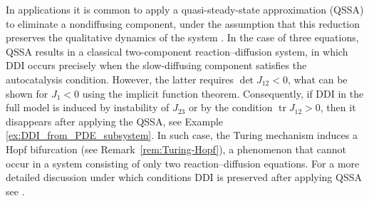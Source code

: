 \documentclass[12pt, a4paper]{amsart}
\numberwithin{equation}{section}
\DeclareMathOperator{\tr}{tr}
\begin{document}
In applications it is common to apply a quasi-steady-state
approximation (QSSA) to eliminate a nondiffusing component, under the
assumption that this reduction preserves the qualitative dynamics of
the system \cite{Haerting17,Zhang2024}. In the case of three equations, QSSA results in a
classical two-component reaction--diffusion system, in which DDI occurs precisely when the slow-diffusing component satisfies the autocatalysis condition.
However, the latter requires $\det J_{12} < 0$, what can be shown for $J_1 < 0$ using the implicit function theorem.  
Consequently, if DDI in
the full model is induced by instability of $J_{23}$ or by the
condition $\tr J_{12} > 0$, then it disappears after
applying the QSSA, see Example \ref{ex:DDI_from_PDE_subsystem}.
In such case, the Turing mechanism induces a Hopf bifurcation (see Remark~\ref{rem:Turing-Hopf}), a phenomenon that cannot occur in a system consisting of only two reaction--diffusion equations.
For a more detailed discussion under which conditions DDI is preserved after applying QSSA see \cite{Smith}.






\end{document}
